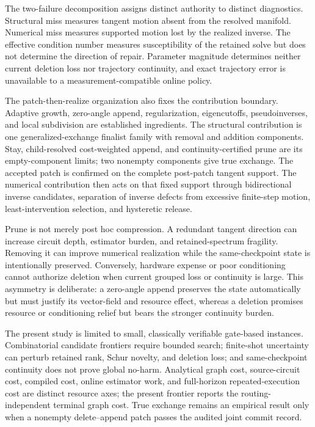 \documentclass[
  reprint,
  amsmath,
  amssymb,
  aps,
  pra,
  nofootinbib,
  superscriptaddress,
  floatfix
]{revtex4-2}
\begin{document}
The two-failure decomposition assigns distinct authority to distinct diagnostics. Structural miss measures tangent motion absent from the resolved manifold. Numerical miss measures supported motion lost by the realized inverse. The effective condition number measures susceptibility of the retained solve but does not determine the direction of repair. Parameter magnitude determines neither current deletion loss nor trajectory continuity, and exact trajectory error is unavailable to a measurement-compatible online policy.

The patch-then-realize organization also fixes the contribution boundary. Adaptive growth, zero-angle append, regularization, eigencutoffs, pseudoinverses, and local subdivision are established ingredients. The structural contribution is one generalized-exchange finalist family with removal and addition components. Stay, child-resolved cost-weighted append, and continuity-certified prune are its empty-component limits; two nonempty components give true exchange. The accepted patch is confirmed on the complete post-patch tangent support. The numerical contribution then acts on that fixed support through bidirectional inverse candidates, separation of inverse defects from excessive finite-step motion, least-intervention selection, and hysteretic release.

Prune is not merely post hoc compression. A redundant tangent direction can increase circuit depth, estimator burden, and retained-spectrum fragility. Removing it can improve numerical realization while the same-checkpoint state is intentionally preserved. Conversely, hardware expense or poor conditioning cannot authorize deletion when current grouped loss or continuity is large. This asymmetry is deliberate: a zero-angle append preserves the state automatically but must justify its vector-field and resource effect, whereas a deletion promises resource or conditioning relief but bears the stronger continuity burden.

The present study is limited to small, classically verifiable gate-based instances. Combinatorial candidate frontiers require bounded search; finite-shot uncertainty can perturb retained rank, Schur novelty, and deletion loss; and same-checkpoint continuity does not prove global no-harm. Analytical graph cost, source-circuit cost, compiled cost, online estimator work, and full-horizon repeated-execution cost are distinct resource axes; the present frontier reports the routing-independent terminal graph cost. True exchange remains an empirical result only when a nonempty delete--append patch passes the audited joint commit record.
\end{document}

